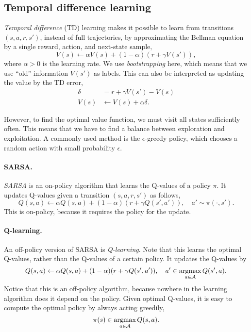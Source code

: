 \subsection{Temporal difference learning}

\textit{Temporal difference} (TD) learning makes it possible to learn from transitions $(s,a,r,s')$,
instead of full trajectories, by approximating the Bellman equation by a single reward, action,
and next-state sample, \[
    V(s) \gets \alpha V(s) + (1-\alpha) (r + \gamma V(s')),
\]
where $\alpha > 0$ is the learning rate. We use \textit{bootstrapping} here, which means that we
use ``old'' information $V(s')$ as labels. This can also be interpreted as updating the value by
the TD error,
\begin{align*}
    \delta & = r + \gamma V(s') - V(s)   \\
    V(s)   & \gets V(s) + \alpha \delta.
\end{align*}

However, to find the optimal value function, we must visit all states sufficiently often. This
means that we have to find a balance between exploration and exploitation. A commonly used method
is the $\epsilon$-greedy policy, which chooses a random action with small probability $\epsilon$.

\paragraph{SARSA.} \textit{SARSA} is an on-policy algorithm that learns the Q-values of a policy
$\pi$. It updates Q-values given a transition $(s, a, r, s')$ as follows, \[
    Q(s,a) \gets \alpha Q(s,a) + (1-\alpha) (r + \gamma Q(s', a')), \quad a' \sim \pi(\cdot, s').
\]
This is on-policy, because it requires the policy for the update.

\paragraph{Q-learning.} An off-policy version of SARSA is \textit{Q-learning}. Note that this learns the optimal Q-values,
rather than the Q-values of a certain policy. It updates the Q-values by \[
    Q(s,a) \gets \alpha Q(s,a) + (1-\alpha) (r + \gamma Q(s', a')), \quad a' \in \operatorname*{argmax}_{a \in \mathcal{A}} Q(s', a).
\]
Notice that this is an off-policy algorithm, because nowhere in the learning algorithm does it
depend on the policy. Given optimal Q-values, it is easy to compute the optimal policy by always
acting greedily, \[
    \pi(s) \in \operatorname*{argmax}_{a \in \mathcal{A}} Q(s, a).
\]

